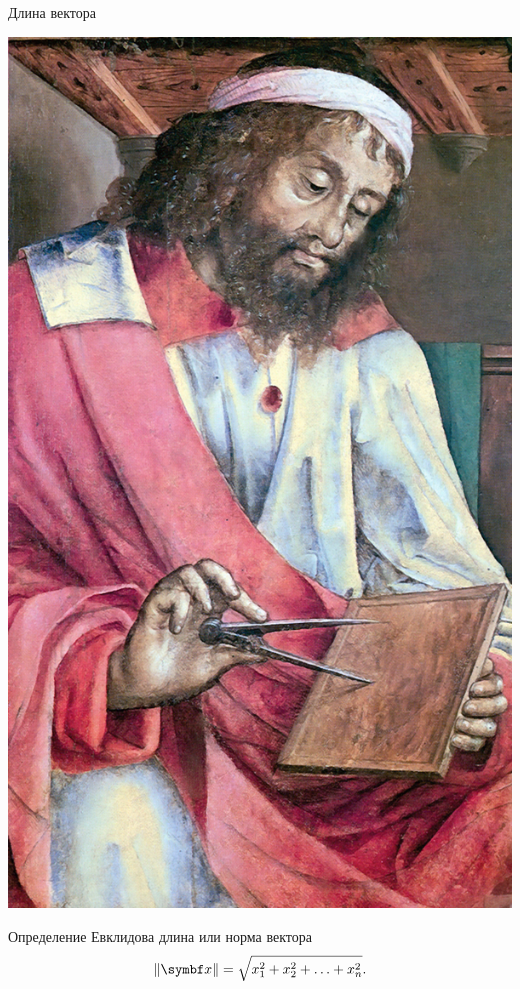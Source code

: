 \begin{frame}{Длина вектора}




\begin{minipage}{0.3\textwidth}%
\includegraphics[scale=0.2]{figures/video_010_euklid.jpg}
\end{minipage}%
\hfill%
\begin{minipage}{0.6\textwidth}

\begin{block}{Определение} 
\alert{Евклидова длина} или \alert{норма} вектора 
\[
  \norm{\bx} = \sqrt{x_1^2 + x_2^2 + \ldots + x_n^2}.
\]
\end{block}
\end{minipage}





\end{frame}



